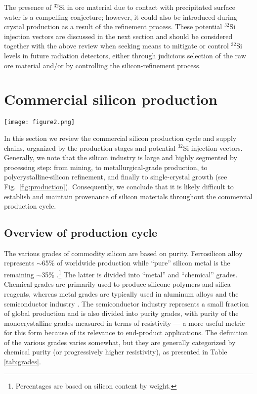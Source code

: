 \documentclass[final,5p]{elsarticle}
\def\si{$^{32}$Si\xspace}
\begin{document}
The presence of \si in ore material due to contact with precipitated surface water is a compelling conjecture;  however, it could also be introduced during crystal production as a result of the refinement process. These potential \si injection vectors are discussed in the next section and should be considered together with the above review when seeking means to mitigate or control \si levels in future radiation detectors, either through judicious selection of the raw ore material and/or by controlling the silicon-refinement process.

\section{Commercial silicon production}\label{sec:commercial}
\begin{figure*}[ht]
\centering
\texttt{[image: figure2.png]}
\caption{\small Simplified outline of the commercial silicon production cycle: from mining of silicon ``ore,'' to metallurgical-grade production, to polysilicon refinement, and finally to single-crystal growth.} 
\label{fig:production}
\end{figure*}

In this section we review the commercial silicon production cycle and supply chains, organized by the production stages and potential \si injection vectors. Generally, we note that the silicon industry is large and highly segmented by processing step: from mining, to metallurgical-grade production, to polycrystalline-silicon refinement, and finally to single-crystal growth (see Fig.\ \ref{fig:production}). Consequently, we conclude that it is likely difficult to establish and maintain provenance of silicon materials throughout the commercial production cycle.

\subsection{Overview of production cycle}\label{ssec:production-cycle}
The various grades of commodity silicon are based on purity. Ferrosilicon alloy represents $\sim$65\% of worldwide production while ``pure'' silicon metal is the remaining $\sim$35\% \cite{usgs_minerals_2017}.\footnote{Percentages are based on silicon content by weight.} The latter is divided into ``metal'' and ``chemical'' grades. Chemical grades are primarily used to produce silicone polymers and silica reagents, whereas metal grades are typically used in aluminum alloys and the semiconductor industry \cite{usgs_website}. The semiconductor industry represents a small fraction of global production and is also divided into purity grades, with purity of the monocrystalline grades measured in terms of resistivity --- a more useful metric for this form because of its relevance to end-product applications. The definition of the various grades varies somewhat, but they are generally categorized by chemical purity (or progressively higher resistivity), as presented in Table \ref{tab:grades}.
\end{document}
